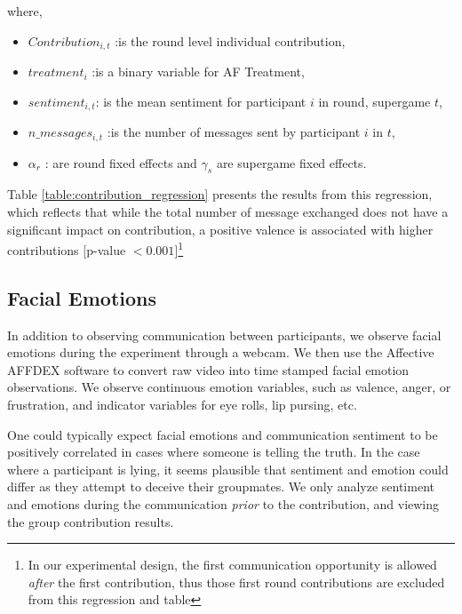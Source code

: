 \documentclass[12pt,letterpaper,english]{article}
\begin{document}
where,
\begin{itemize}
    \item $Contribution_{i,t}$ :is the round level individual contribution,
    \item $treatment_{i}$ :is a binary variable for AF Treatment,
    \item $sentiment_{i,t}$: is the mean sentiment for participant $i$ in round, supergame $t$, 
    \item $n\_messages_{i,t}$ :is the number of messages sent by participant $i$ in $t$,
    \item $\alpha_r$ : are round fixed effects and $\gamma_s$ are supergame fixed effects.
\end{itemize}    
Table \ref{table:contribution_regression}
presents the results from this regression, which reflects that while the total number of message exchanged does not have a significant impact on contribution, a positive valence is associated with higher contributions [p-value $< 0.001$]\footnote{In our experimental design, the first communication opportunity is allowed \textit{after} the first contribution, thus those first round contributions are excluded
from this regression and table}



\subsection{Facial Emotions}

In addition to observing communication between participants, we observe facial emotions during the experiment
through a webcam. We then use the Affective AFFDEX software to convert raw video into time stamped facial emotion observations.
We observe continuous emotion variables, such as valence, anger, or frustration, and indicator variables for eye rolls, lip pursing, etc. 

One could typically expect facial emotions and communication sentiment to be positively correlated in cases where someone is telling the truth.
In the case where a participant is lying, it seems plausible that sentiment and emotion could differ as they attempt to deceive their groupmates.
We only analyze sentiment and emotions during the communication \textit{prior} to the contribution, and viewing the group contribution results.
\end{document}
